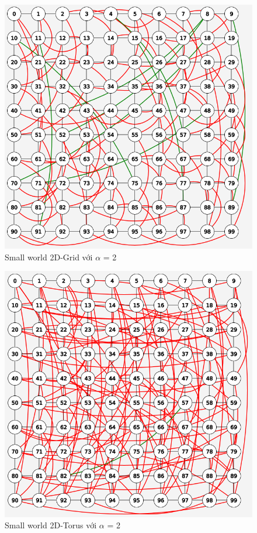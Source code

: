 \documentclass[../report.tex]{subfiles}
\begin{document}
\begin{figure}[H]
    \centering
    \includegraphics[scale=0.55]{figures/grid2.png}
    \caption{Small world 2D-Grid với $\alpha$ = 2}
\end{figure}

\begin{figure}[H]
    \centering
    \includegraphics[scale=0.55]{figures/torus2.png}
    \caption{Small world 2D-Torus với $\alpha$ = 2}
\end{figure}
\end{document}
